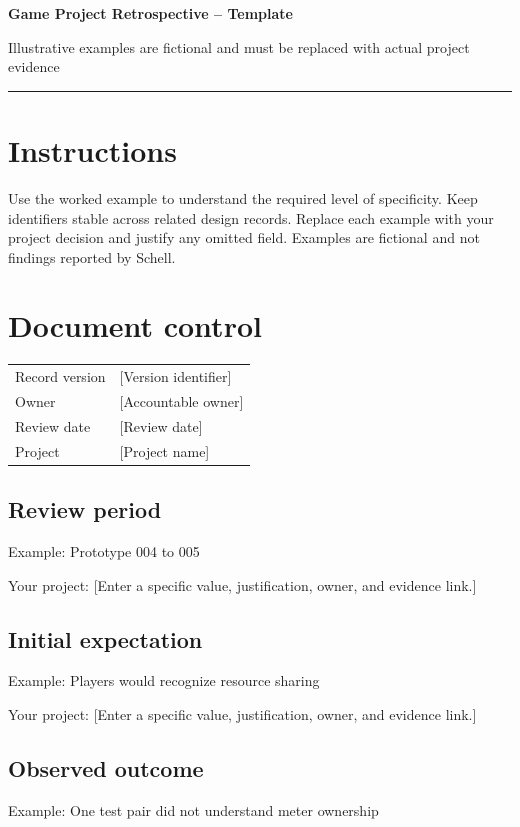 \documentclass[11pt]{article}
\begin{document}
{\huge\bfseries\color{suiteblue} Game Project Retrospective -- Template}\par
\vspace{0.15in}
{\normalsize\color{suitegray} Illustrative examples are fictional and must be replaced with actual project evidence}\par
\vspace{0.15in}\hrule\vspace{0.15in}

\section{Instructions}
Use the worked example to understand the required level of specificity. Keep identifiers stable across related design records. Replace each example with your project decision and justify any omitted field. Examples are fictional and not findings reported by Schell.


\section{Document control}
\begin{tabularx}{\linewidth}{@{}lX@{}}\toprule Record version & [Version identifier]\\ Owner & [Accountable owner]\\ Review date & [Review date]\\ Project & [Project name]\\\bottomrule\end{tabularx}

\subsection{Review period}
Example: Prototype 004 to 005

Your project: [Enter a specific value, justification, owner, and evidence link.]


\subsection{Initial expectation}
Example: Players would recognize resource sharing

Your project: [Enter a specific value, justification, owner, and evidence link.]


\subsection{Observed outcome}
Example: One test pair did not understand meter ownership
\end{document}
